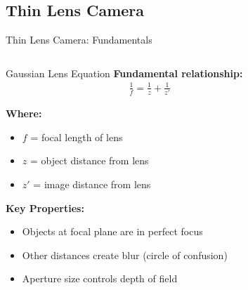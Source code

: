 \subsection{Thin Lens Camera}

\begin{frame}{Thin Lens Camera: Fundamentals}
  \begin{columns}
    \begin{column}{0.5\textwidth}
      \begin{mathbox}{Gaussian Lens Equation}
        \textbf{Fundamental relationship:}
        \begin{align}
          \frac{1}{f} = \frac{1}{z} + \frac{1}{z'}
        \end{align}

        \textbf{Where:}
        \begin{itemize}
          \item $f$ = focal length of lens
          \item $z$ = object distance from lens
          \item $z'$ = image distance from lens
        \end{itemize}

        \vspace{0.3cm}
        \textbf{Key Properties:}
        \begin{itemize}
          \item Objects at focal plane are in perfect focus
          \item Other distances create blur (circle of confusion)
          \item Aperture size controls depth of field
        \end{itemize}
      \end{mathbox}
    \end{column}
    \begin{column}{0.5\textwidth}
\end{column}
\end{columns}
\end{frame}

